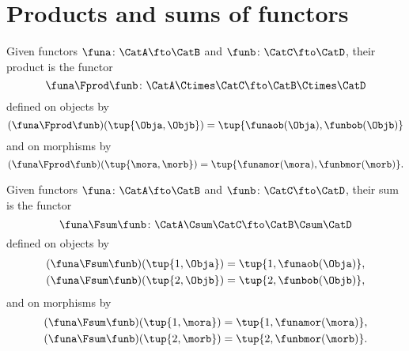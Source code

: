 \section{Products and sums of functors}
\label{sec:products-sums-functors}

\begin{ctdefinition}\label{def:product-of-functors}
    Given functors $\funa \colon \CatA \fto \CatB$ and $\funb \colon \CatC \fto \CatD$, their product is the functor $$\funa \Fprod \funb \colon \CatA \Ctimes \CatC \fto \CatB \Ctimes \CatD$$
    defined on objects by
    \begin{equation}
        (\funa \Fprod \funb) (\tup{\Obja, \Objb}) = \tup{\funaob(\Obja), \funbob(\Objb)}
    \end{equation}
    and on morphisms by
    \begin{equation}
        (\funa \Fprod \funb) (\tup{\mora, \morb}) = \tup{\funamor(\mora), \funbmor(\morb)}.
    \end{equation}
\end{ctdefinition}

\begin{ctdefinition}\label{def:sum-of-functors}
    Given functors $\funa \colon \CatA \fto \CatB$ and $\funb \colon \CatC \fto \CatD$, their sum is the functor
    \begin{equation*}
        \funa \Fsum \funb \colon \CatA \Csum \CatC \fto \CatB \Csum \CatD
    \end{equation*}
    defined on objects by
    \begin{equation}
        \begin{aligned}
            (\funa \Fsum \funb) (\tup{1, \Obja}) = \tup{1, \funaob(\Obja)}, \\
            (\funa \Fsum \funb) (\tup{2, \Objb}) = \tup{2, \funbob(\Objb)},
        \end{aligned}
    \end{equation}
    and on morphisms by
    \begin{equation}
        \begin{aligned}
            (\funa \Fsum \funb) (\tup{1, \mora}) = \tup{1, \funamor(\mora)}, \\
            (\funa \Fsum \funb) (\tup{2, \morb}) = \tup{2, \funbmor(\morb)}.
        \end{aligned}
    \end{equation}
\end{ctdefinition}